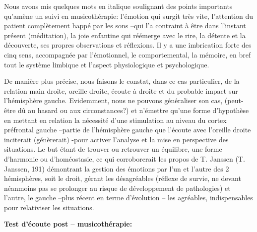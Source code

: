       Nous avons mis quelques mots en italique soulignant des  points
      importants qu'amène un suivi en musicothérapie: l'émotion qui surgit très
      vite,
      l'attention du patient complètement happé par les sons --qui l'a
      contraint à être dans l'instant présent (méditation), la joie
      enfantine qui réémerge avec le rire, la détente et la découverte,
      ses propres observations et réflexions.
      Il y a une imbrication forte des cinq sens, accompagnée par l'émotionnel, le comportemental, la
      mémoire, en bref tout le système limbique et l'aspect
      physiologique et psychologique.

      De manière plus précise, nous faisons le constat, dans ce cas
      particulier,  de la relation main droite, oreille droite, écoute
      à droite et du probable impact sur l'hémisphère gauche.
      Evidemment, nous ne pouvons généraliser son cas, (peut-être dû au hasard ou aux circonstances?) et n'émettre qu'une forme d'hypothèse 
      en mettant en relation la nécessité d'une stimulation au niveau du cortex préfrontal
      gauche --partie de l'hémisphère gauche que l'écoute avec
      l'oreille droite inciterait (génèrerait) -pour activer l'analyse et la
      mise en perspective des situations. Le but étant de trouver ou
      retrouver un équilibre, une forme d'harmonie ou d'homéostasie, ce qui corroborerait les
      propos de T. Janssen (T. Janssen, 191)  démontrant la gestion des émotions par
      l'un et l'autre des 2 hémisphères, soit le droit,  gérant les désagréables
      (réflexe de survie, ne devant néanmoins pas se prolonger au risque de
      développement de pathologies)
      et l'autre, le gauche --plus récent en terme d'évolution -- les
      agréables, indispensables pour relativiser les situations.
      
     
\textbf{ Test d'écoute post -- musicothérapie:}
        
    	
 	

